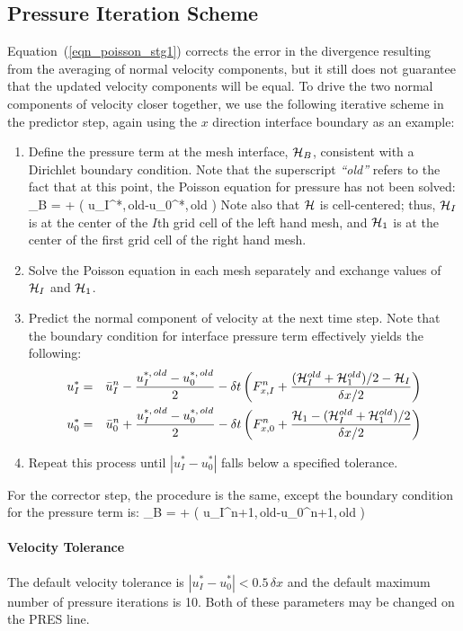 \subsection{Pressure Iteration Scheme}
\label{section:pressure_iteration}

Equation~(\ref{eqn_poisson_stg1}) corrects the error in the divergence resulting from the averaging of normal velocity components, but it still does not guarantee that the
updated velocity components will be equal. To drive the two normal components of velocity closer together, we use the
following iterative scheme in the predictor step, again using the $x$ direction interface boundary as an example:
\begin{enumerate}
\item Define the pressure term at the mesh interface, ${\cal H}_B$, consistent with a Dirichlet boundary condition. Note that the superscript \emph{``old''} refers to the fact that at this point, the Poisson equation for pressure has not been solved:
\be
   \cH_B =  +  \left( u_I^{*,\,old}-u_0^{*,\,old} \right)
\ee
Note also that ${\cal H}$ is cell-centered; thus, ${\cal H}_I$ is at the center of the $I$th grid cell of the left hand mesh, and ${\cal H}_1$ is at the center of the first grid cell of the right hand mesh.
\item Solve the Poisson equation in each mesh separately and exchange values of ${\cal H}_I$ and ${\cal H}_1$.
\item Predict the normal component of velocity at the next time step. Note that the boundary condition for interface pressure term effectively yields the following:
\begin{eqnarray}
   u_I^* &=& \bar{u}_I^n - \frac{u_I^{*,\, old}-u_0^{*,\, old}}{2} - \delta t \left( F_{x,I}^{n} + \frac{ ({\cal H}_I^{old}+{\cal H}_1^{old})/2 - {\cal H}_I }{ \delta x/2} \right) \label{uI} \\
   u_0^* &=& \bar{u}_0^n + \frac{u_I^{*,\, old}-u_0^{*,\, old}}{2} - \delta t \left( F_{x,0}^{n} + \frac{ {\cal H}_1 - ({\cal H}_I^{old}+{\cal H}_1^{old})/2 }{ \delta x/2} \right) \label{u0}
\end{eqnarray}
\item Repeat this process until $\left| u_I^* - u_0^* \right|$ falls below a specified tolerance.
\end{enumerate}
For the corrector step, the procedure is the same, except the boundary condition for the pressure term is:
\be
   \cH_B =  +  \left( u_I^{n+1,\,old}-u_0^{n+1,\,old} \right)
\ee

\paragraph{Velocity Tolerance} The default velocity tolerance is $\left| u_I^* - u_0^* \right| < 0.5 \, \delta x$ and the default maximum number of pressure iterations is 10.  Both of these parameters may be changed on the {\ct PRES} line.




